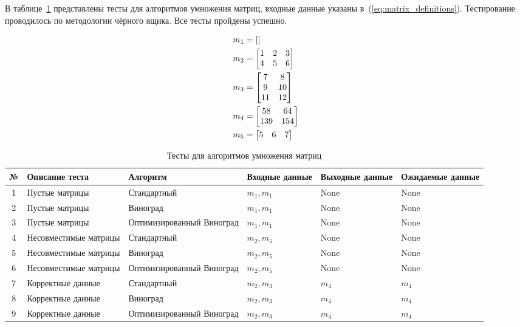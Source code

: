 В таблице~\ref{table:matrix_tests} представлены тесты для алгоритмов умножения матриц, входные данные указаны в~(\ref{eq:matrix_definitions}). Тестирование проводилось по методологии чёрного ящика. Все тесты пройдены успешно.

\begin{align}
&m_1 = [] \\
&m_2 = \begin{bmatrix} 
1 & 2 & 3 \\ 
4 & 5 & 6 
\end{bmatrix} \notag \\
&m_3 = \begin{bmatrix} 
7 & 8 \\ 
9 & 10 \\ 
11 & 12 
\end{bmatrix} \notag \\
&m_4 = \begin{bmatrix} 
58 & 64 \\ 
139 & 154 
\end{bmatrix} \notag \\
&m_5 = \begin{bmatrix} 
5 & 6 & 7 
\end{bmatrix} \label{eq:matrix_definitions}
\end{align}

\begin{table}[htb]
\caption{Тесты для алгоритмов умножения матриц}
\small
\centering
\begin{tabular}{|c|p{3cm}|p{4cm}|p{2cm}|p{2.1cm}|p{2.4cm}|}
    \hline
    № & \textbf{Описание теста} & \textbf{Алгоритм} & \textbf{Входные данные} & \textbf{Выходные данные} & \textbf{Ожидаемые данные} \\ \hline
    1 & Пустые матрицы & Стандартный & $m_1, m_1$ & None & None \\ \hline
    2 & Пустые матрицы & Виноград & $m_1, m_1$ & None & None \\ \hline
    3 & Пустые матрицы & Оптимизированный Виноград & $m_1, m_1$ & None & None \\ \hline
    4 & Несовместимые матрицы & Стандартный & $m_2, m_5$ & None & None \\ \hline
    5 & Несовместимые матрицы & Виноград & $m_2, m_5$ & None & None \\ \hline
    6 & Несовместимые матрицы & Оптимизированный Виноград & $m_2, m_5$ & None & None \\ \hline
    7 & Корректные данные & Стандартный & $m_2, m_3$ & $m_4$ & $m_4$ \\ \hline
    8 & Корректные данные & Виноград & $m_2, m_3$ & $m_4$ & $m_4$ \\ \hline
    9 & Корректные данные & Оптимизированный Виноград & $m_2, m_3$ & $m_4$ & $m_4$ \\ \hline
\end{tabular}
\label{table:matrix_tests}
\end{table}


